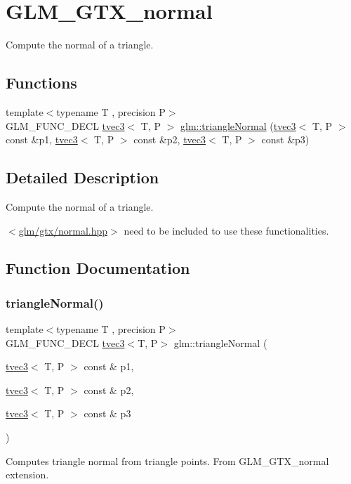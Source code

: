 \hypertarget{group__gtx__normal}{}\section{G\+L\+M\+\_\+\+G\+T\+X\+\_\+normal}
\label{group__gtx__normal}


Compute the normal of a triangle.  


\subsection*{Functions}
\begin{DoxyCompactItemize}
\item 
{\footnotesize template$<$typename T , precision P$>$ }\\G\+L\+M\+\_\+\+F\+U\+N\+C\+\_\+\+D\+E\+CL \hyperlink{structglm_1_1tvec3}{tvec3}$<$ T, P $>$ \hyperlink{group__gtx__normal_ga7842850bcda582f1756883e3ed950e14}{glm\+::triangle\+Normal} (\hyperlink{structglm_1_1tvec3}{tvec3}$<$ T, P $>$ const \&p1, \hyperlink{structglm_1_1tvec3}{tvec3}$<$ T, P $>$ const \&p2, \hyperlink{structglm_1_1tvec3}{tvec3}$<$ T, P $>$ const \&p3)
\end{DoxyCompactItemize}


\subsection{Detailed Description}
Compute the normal of a triangle. 

$<$\hyperlink{normal_8hpp}{glm/gtx/normal.\+hpp}$>$ need to be included to use these functionalities. 

\subsection{Function Documentation}
\mbox{\label{group__gtx__normal_ga7842850bcda582f1756883e3ed950e14}} 
\subsubsection{\texorpdfstring{triangle\+Normal()}{triangleNormal()}}
{\footnotesize\ttfamily template$<$typename T , precision P$>$ \\
G\+L\+M\+\_\+\+F\+U\+N\+C\+\_\+\+D\+E\+CL \hyperlink{structglm_1_1tvec3}{tvec3}$<$T, P$>$ glm\+::triangle\+Normal (\begin{DoxyParamCaption}\item[{\hyperlink{structglm_1_1tvec3}{tvec3}$<$ T, P $>$ const \&}]{p1,  }\item[{\hyperlink{structglm_1_1tvec3}{tvec3}$<$ T, P $>$ const \&}]{p2,  }\item[{\hyperlink{structglm_1_1tvec3}{tvec3}$<$ T, P $>$ const \&}]{p3 }\end{DoxyParamCaption})}

Computes triangle normal from triangle points. From G\+L\+M\+\_\+\+G\+T\+X\+\_\+normal extension. 